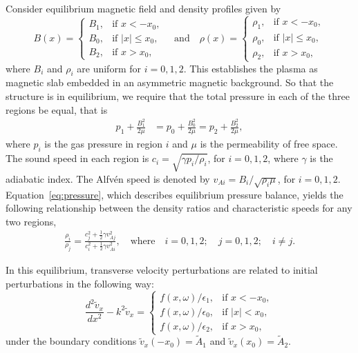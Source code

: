 \documentclass{aastex61}
\begin{document}
Consider equilibrium magnetic field and density profiles given by
\begin{equation}
B(x)=
\begin{cases}
B_1, & \text{if  }x<-x_0, \\
B_0, & \text{if }|x|\leq{x_0}, \\
B_2, & \text{if  }x>x_0,
\end{cases}
\quad \text{and} \quad
\rho(x)=
\begin{cases}
\rho_1, & \text{if  }x<-x_0, \\
\rho_0, & \text{if }|x|\leq{x_0}, \\
\rho_2, & \text{if  }x>x_0,
\end{cases}
\end{equation}
where $B_i$ and $\rho_i$ are uniform for $i = 0,1,2$. This establishes the plasma as magnetic slab embedded in an asymmetric magnetic background. So that the structure is in equilibrium, we require that the total pressure in each of the three regions be equal, that is
\begin{align}
p_1 + \frac{B_1^2}{2\mu} &= p_0  + \frac{B_0^2 }{2\mu} = p_2 + \frac{B_2^2 }{2\mu}, \label{eq:pressure}
\end{align}
where $p_i$ is the gas pressure in region $i$ and $\mu$ is the permeability of free space. The sound speed in each region is $c_i = \sqrt{\gamma p_i / \rho_i}$, for $i = 0, 1, 2$, where $\gamma$ is the adiabatic index. The Alfv\'{e}n speed is denoted by $v_{Ai}= B_i/\sqrt{\rho_i \mu}$, for $i=0,1,2$. Equation~\ref{eq:pressure}, which describes equilibrium pressure balance, yields the following relationship between the density ratios and characteristic speeds for any two regions,
\begin{align}
\frac{\rho_i}{\rho_j}= \frac{c_j^2 + \frac{1}{2} \gamma v_{Aj}^2}{c_i^2 + \frac{1}{2} \gamma v_{Ai}^2}, \quad \text{where} \quad i=0,1,2; \quad j=0,1,2; \quad i \neq j. \label{eq:ratio}
\end{align}

In this equilibrium, transverse velocity perturbations are related to initial perturbations in the following way:
\begin{equation}
\frac{d^2\tilde{v}_x}{dx^2} - k^2\tilde{v}_x = 
\begin{cases}
f(x, \omega)/\epsilon_1, & \text{if  } x<-x_0,\\
f(x, \omega)/\epsilon_0, & \text{if  } |x|<x_0,\\
f(x, \omega)/\epsilon_2, & \text{if  } x>x_0,
\end{cases}
\label{ivp gov slab 2}
\end{equation}
under the boundary conditions $\tilde{v}_x(-x_0) = \tilde{A}_1$ and $\tilde{v}_x(x_0) = \tilde{A}_2$.
\end{document}
